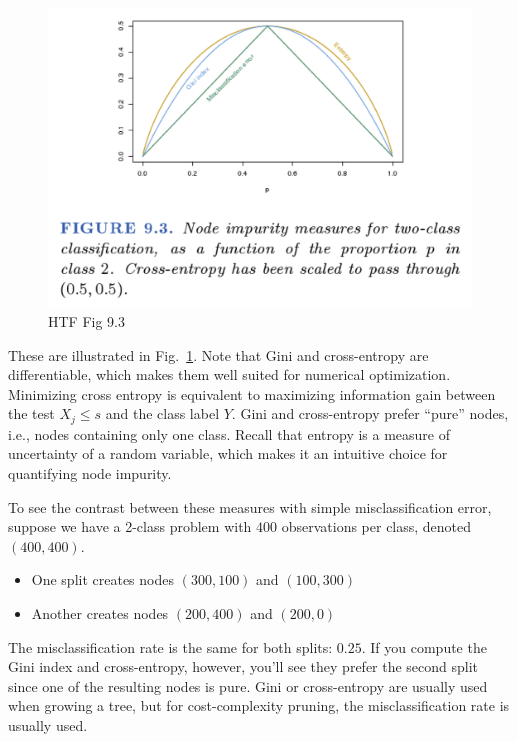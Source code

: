 \documentclass[a4paper]{article}
\begin{document}
\begin{figure}
\centering
\includegraphics[width=1.0\textwidth]{fig9_3.png}
\caption{\label{fig:tree4} HTF Fig 9.3}
\end{figure}
These are illustrated in Fig.~\ref{fig:tree4}.  Note that Gini and cross-entropy are differentiable, which makes them well suited for numerical optimization.  
Minimizing cross entropy is equivalent to maximizing information gain between the test $X_j \leq s$ and the class label $Y$.
Gini and cross-entropy prefer ``pure'' nodes, i.e., nodes containing only one class.  Recall that entropy is a measure of uncertainty of a random variable, which makes it an intuitive choice for quantifying node impurity.

To see the contrast between these measures with simple misclassification error, suppose we have a 2-class problem with $400$ observations per class, denoted $(400, 400)$.
\begin{itemize}
\item One split creates nodes $(300,100)$ and $(100,300)$
\item Another creates nodes $(200,400)$ and $(200,0)$
\end{itemize}
The misclassification rate is the same for both splits: $0.25$.
If you compute the Gini index and cross-entropy, however, you'll see they prefer the second split since one of the resulting nodes is pure.  Gini or cross-entropy are usually used when growing a tree, but for cost-complexity pruning, the misclassification rate is usually used.
\end{document}

